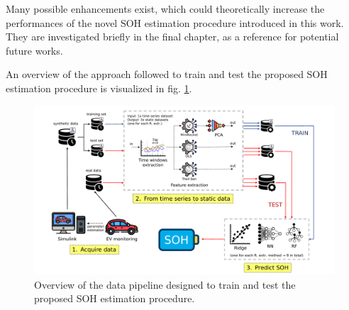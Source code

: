 Many possible enhancements exist, which could theoretically increase the performances of the novel SOH estimation procedure introduced in this work. They are investigated briefly in the final chapter, as a reference for potential future works.

\smallskip

An overview of the approach followed to train and test the proposed SOH estimation procedure is visualized in fig. \ref{fig:overview}.

\begin{figure}
    \centering
    \includegraphics[width=\textwidth]{images/schemone.pdf}
    \caption[Overview of the data pipeline designed to train and test the proposed SOH estimation procedure]{Overview of the data pipeline designed to train and test the proposed SOH estimation procedure.}
    \label{fig:overview}
\end{figure}